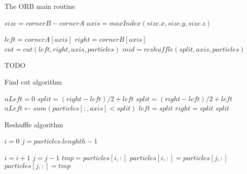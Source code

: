 \documentclass[]{article}
\begin{document}
\begin{algorithm}[H]
	\caption{The ORB main routine}\label{euclid}
	\begin{algorithmic}[1]
		\State $size = cornerB - cornerA$
		\State $axis = maxIndex(size.x, size.y, size.z)$ 
		
		\State $left = cornerA[axis]$
		\State $right = cornerB[axis]$
		\newline
		\State $cut = cut(left, right, axis, particles)$
		\State $mid = reshuffle(split, axis, particles)$
		\newline
		
		TODO
		\State {}
		\EndProcedure
	\end{algorithmic}
\end{algorithm}

\begin{algorithm}[H]
	\caption{Find cut algorithm}\label{euclid}
	\begin{algorithmic}[1]
		\State $nLeft = 0$
		\State $split = (right - left) / 2 + left $ 
		\State $split = (right - left) / 2 + left $
		\State $nLeft\gets sum(particles[:,axis] < split)$
		\State $left = split$
		\Else 
		\State $right = split$
		\EndIf
		\EndWhile\label{euclidendwhile}
		\State \Return $split$
		\EndProcedure
	\end{algorithmic}
\end{algorithm}


\begin{algorithm}[H]
	\caption{Reshuffle algorithm}\label{euclid}
	\begin{algorithmic}[1]
		\State $i = 0$
		\State $j = particles.lenghth - 1$
		
		\State $i = i + 1$
		\State $j = j - 1$
		\Else
		\State $tmp = particles[i,:]$
		\State $particles[i,:] = particles[j,:]$
		\State $particles[j,:] = tmp$
		\EndIf
		\EndWhile\label{euclidendwhile}
		
		\EndProcedure
	\end{algorithmic}
\end{algorithm}

\vspace{5mm}
\end{document}
